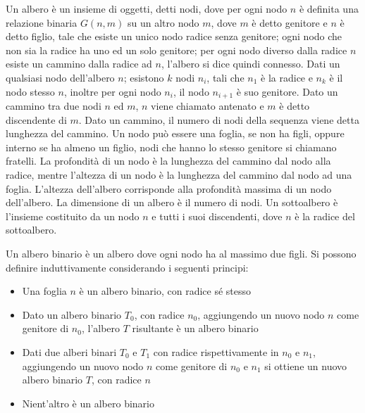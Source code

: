 \documentclass{article}
\numberwithin{equation}{subsection}
\begin{document}
Un albero è un insieme di oggetti, detti nodi, dove per ogni nodo $n$ è definita una relazione binaria $G(n,m)$ su un altro nodo $m$, dove $m$ è detto genitore e $n$ è detto figlio, tale che esiste un unico nodo radice senza genitore; ogni nodo che non sia la radice ha uno ed un solo genitore; per ogni nodo diverso dalla radice $n$ esiste un cammino dalla radice ad $n$, l'albero si dice quindi connesso. 
Dati un qualsiasi nodo dell'albero $n$; esistono $k$ nodi $n_i$, tali che $n_1$ è la radice e $n_k$ è il nodo stesso $n$, inoltre per ogni nodo $n_i$, il nodo $n_{i+1}$ è suo genitore. Dato un cammino tra due nodi $n$ ed $m$, $n$ viene chiamato antenato e $m$ è detto discendente di $m$. Dato un cammino, il numero di nodi della sequenza viene detta lunghezza del cammino. Un nodo può essere una foglia, se non ha figli, oppure interno se ha almeno un figlio, nodi che hanno lo stesso genitore si chiamano fratelli. 
La profondità di un nodo è la lunghezza del cammino dal nodo alla radice, mentre l'altezza di un nodo è la lunghezza del cammino dal nodo ad una foglia. 
L'altezza dell'albero corrisponde alla profondità massima di un nodo dell'albero. La dimensione di un albero è il numero di nodi. 
Un sottoalbero è l'insieme costituito da un nodo $n$ e tutti i suoi discendenti, dove $n$ è la radice del sottoalbero.  

Un albero binario è un albero dove ogni nodo ha al massimo due figli. Si possono definire induttivamente considerando i seguenti principi:
\begin{itemize}
    \item Una foglia $n$ è un albero binario, con radice sé stesso
    \item Dato un albero binario $T_0$, con radice $n_0$, aggiungendo un nuovo nodo $n$ come genitore di $n_0$, l'albero $T$ risultante è un albero binario
    \item Dati due alberi binari $T_0$ e $T_1$ con radice rispettivamente in $n_0$ e $n_1$, aggiungendo un nuovo nodo $n$ come genitore di $n_0$ e $n_1$ si ottiene un nuovo albero binario $T$, con radice $n$
    \item Nient'altro è un albero binario
\end{itemize}
\end{document}
